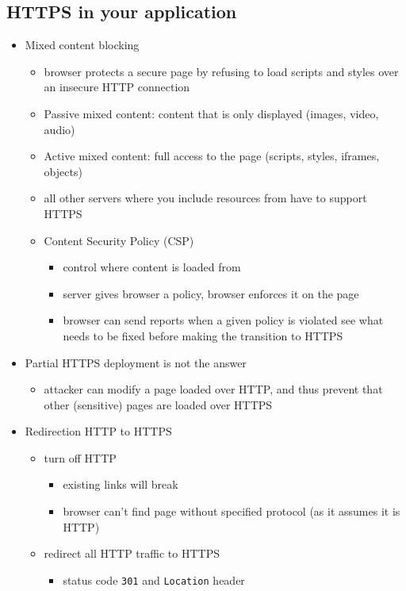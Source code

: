 \documentclass[12pt,titlepage,a4paper]{report}
\begin{document}
	\subsection{HTTPS in your application}
	\begin{itemize}
		\item Mixed content blocking
		\begin{itemize}
			\item browser protects a secure page by refusing to load scripts and styles over an insecure HTTP connection
			\item Passive mixed content: content that is only displayed (images, video, audio)
			\item Active mixed content: full access to the page (scripts, styles, iframes, objects)
			\item all other servers where you include resources from have to support HTTPS
			\item Content Security Policy (CSP)
			\begin{itemize}
				\item control where content is loaded from
				\item server gives browser a policy, browser enforces it on the page
				\item browser can send reports when a given policy is violated
					\subitem see what needs to be fixed before making the transition to HTTPS
			\end{itemize}
		\end{itemize}
	
		\item Partial HTTPS deployment is not the answer
		\begin{itemize}
			\item attacker can modify a page loaded over HTTP, and thus prevent that other (sensitive) pages are loaded over HTTPS
		\end{itemize}
	
		\item Redirection HTTP to HTTPS
		\begin{itemize}
			\item turn off HTTP
			\begin{itemize}
				\item existing links will break
				\item browser can't find page without specified protocol (as it assumes it is HTTP)
			\end{itemize}
			\item redirect all HTTP traffic to HTTPS
			\begin{itemize}
				\item status code \texttt{301} and \texttt{Location} header
			\end{itemize}
		\end{itemize}
	

\end{itemize}
\end{document}
